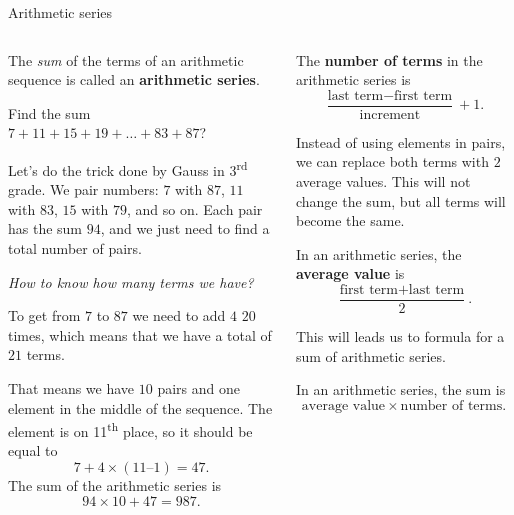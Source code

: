 \documentclass[9pt,aspectratio=169]{beamer}
\begin{document}
\begin{frame}{Arithmetic series}
  \begin{columns}[T]
    \begin{column}{0.5\textwidth}
      \begin{definition}
        The \emph{sum} of the terms of an arithmetic sequence is called an \textbf{arithmetic series}.
      \end{definition}
      \begin{problem}
        Find the sum $7 + 11 + 15 + 19 + \ldots + 83 + 87$?
      \end{problem}

      Let's do the trick done by Gauss in 3\textsuperscript{rd} grade. We pair numbers: $7$ with $87$, $11$ with $83$, $15$ with $79$, and so on. Each pair has the sum $94$, and we just need to find a total number of pairs.\smallskip

      \emph{How to know how many terms we have?}

      To get from $7$ to $87$ we need to add $4$ $20$ times, which means that we have a total of $21$ terms.

      That means we have $10$ pairs and one element in the middle of the sequence. The element is on 11\textsuperscript{th} place, so it should be equal to 
      \[ 7 + 4 \times (11 – 1) = 47. \]
      The sum of the arithmetic series is 
      \[ 94 \times 10 + 47 = 987. \]
    \end{column}
    \begin{column}{0.5\textwidth}
      \begin{definition}
        The \textbf{number of terms} in the arithmetic series is
        \[ \frac{\text{last term} - \text{first term}}{\text{increment}} + 1.\]
        \vspace*{-0.8em}
      \end{definition}
      Instead of using elements in pairs, we can replace both terms with $2$ average values. This will not change the sum, but all terms will become the same. 
      \begin{definition}
        In an arithmetic series, the \textbf{average value} is 
        \[ \frac{\text{first term} + \text{last term}}{2}. \]\vspace*{-0.8em}
      \end{definition}
      This will leads us to formula for a sum of arithmetic series.
      \begin{definition}
        In an arithmetic series, the sum is 
        \[ \text{average value} \times \text{number of terms}.\]\vspace*{-1.2em}
      \end{definition}
    \end{column}
  \end{columns}
\end{frame}
\end{document}
